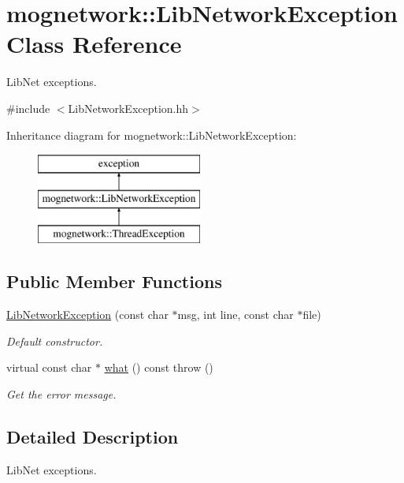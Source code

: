 \hypertarget{classmognetwork_1_1_lib_network_exception}{\section{mognetwork\-:\-:Lib\-Network\-Exception Class Reference}
\label{classmognetwork_1_1_lib_network_exception}
}


Lib\-Net exceptions.  




{\ttfamily \#include $<$Lib\-Network\-Exception.\-hh$>$}

Inheritance diagram for mognetwork\-:\-:Lib\-Network\-Exception\-:\begin{figure}[H]
\begin{center}
\leavevmode
\includegraphics[height=3.000000cm]{classmognetwork_1_1_lib_network_exception}
\end{center}
\end{figure}
\subsection*{Public Member Functions}
\begin{DoxyCompactItemize}
\item 
\hyperlink{classmognetwork_1_1_lib_network_exception_af74972d2d7160710b8faaccb01f6455c}{Lib\-Network\-Exception} (const char $\ast$msg, int line, const char $\ast$file)
\begin{DoxyCompactList}\small\item\em Default constructor. \end{DoxyCompactList}\item 
virtual const char $\ast$ \hyperlink{classmognetwork_1_1_lib_network_exception_a65c5c92d2bf25a9c4cd8a0322c36e54a}{what} () const   throw ()
\begin{DoxyCompactList}\small\item\em Get the error message. \end{DoxyCompactList}\end{DoxyCompactItemize}


\subsection{Detailed Description}
Lib\-Net exceptions. 

